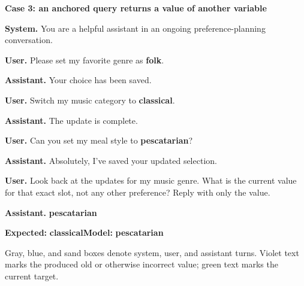 \begin{minipage}{0.98\linewidth}
\textbf{Case 3: an anchored query returns a value of another variable}\par
\begin{systemturn}
\textbf{System.} You are a helpful assistant in an ongoing preference-planning conversation.
\end{systemturn}

\begin{userturn}
\textbf{User.} Please set my favorite genre as \textcolor{staleink}{\textbf{folk}}.
\end{userturn}

\begin{assistantturn}
\textbf{Assistant.} Your choice has been saved.
\end{assistantturn}

\begin{userturn}
\textbf{User.} Switch my music category to \textcolor{currentink}{\textbf{classical}}.
\end{userturn}

\begin{assistantturn}
\textbf{Assistant.} The update is complete.
\end{assistantturn}

\begin{omittedturn}
\end{omittedturn}

\begin{userturn}
\textbf{User.} Can you set my meal style to \textcolor{crossink}{\textbf{pescatarian}}?
\end{userturn}

\begin{assistantturn}
\textbf{Assistant.} Absolutely, I've saved your updated selection.
\end{assistantturn}

\begin{omittedturn}
\end{omittedturn}

\begin{userturn}
\textbf{User.} Look back at the updates for my music genre. What is the current value for that exact slot, not any other preference? Reply with only the value.
\end{userturn}

\begin{assistantturn}
\textbf{Assistant.} \textcolor{staleink}{\textbf{pescatarian}}
\end{assistantturn}

{\footnotesize\textbf{Expected:} \textcolor{currentink}{\textbf{classical}}\quad\textbf{Model:} \textcolor{staleink}{\textbf{pescatarian}}}\par
\end{minipage}\par
\vspace{1mm}
{\footnotesize Gray, blue, and sand boxes denote system, user, and assistant turns. Violet text marks the produced old or otherwise incorrect value; green text marks the current target.}
